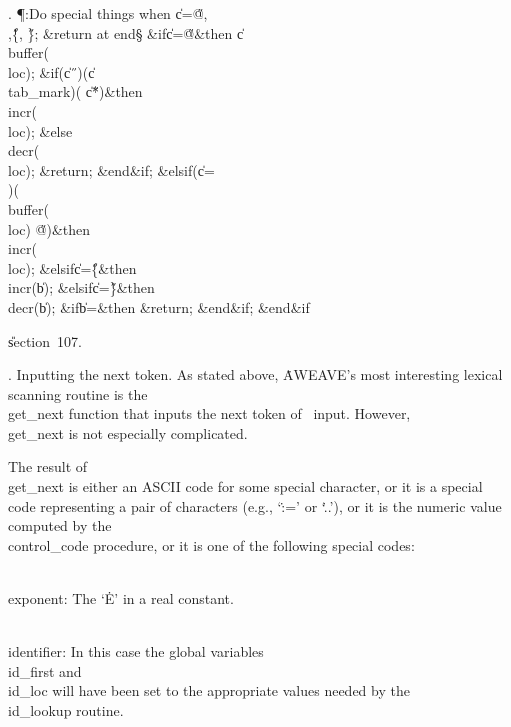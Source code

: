 . \P\?:Do special things when \|c\?=\?\H{@}\?,\?\H{\\}\?,\?\H{\{}\?,%
\?\H{\}}; \&{return} at end\X\S\?\6
\&{if}\1\1\8\|c\?=\?\H{@}\2\8\&{then}\6
\|c\?\K\?\\{buffer}\?\1(\?\\{loc}\?\2)\?;\6
\&{if}\1\1\?\8\1(\?\|c\?\I\?\H{\ }\?\2)\W\1(\?\|c\?\I\?\\{tab\_mark}\?\2)\W\1(%
\?\|c\?\I\?\H{*}\?\2)\?\2\8\&{then}\6
\\{incr}\?\1(\?\\{loc}\?\2)\?;\6
\4\&{else}\6
\\{decr}\?\1(\?\\{loc}\?\2)\?;\5
\?\&{return}\?;\2\6
\&{end}\8\2\&{if}\1;\6
\4\&{elsif}\1\?\8\1(\?\|c\?=\?\H{\\}\?\2)\W\1(\?\\{buffer}\?\1(\?\\{loc}\?\2)\I%
\?\H{@}\?\2)\?\2\8\&{then}\6
\\{incr}\?\1(\?\\{loc}\?\2)\?;\6
\4\&{elsif}\1\8\|c\?=\?\H{\{}\2\8\&{then}\6
\\{incr}\?\1(\?\|b\?\2)\?;\6
\4\&{elsif}\1\8\|c\?=\?\H{\}}\2\8\&{then}\6
\\{decr}\?\1(\?\|b\?\2)\?;\6
\&{if}\1\1\8\|b\?=\2\8\&{then}\6
\?\&{return}\?;\2\6
\&{end}\8\2\&{if}\1;\2\6
\&{end}\8\2\&{if}\1\par
\U section~107.\fi

.  Inputting the next token.
As stated above, \.{AWEAVE}'s most interesting lexical scanning routine is the
\\{get\_next} function that inputs the next token of \ADA\ input. However,
\\{get\_next} is not especially complicated.

The result of \\{get\_next} is either an ASCII code for some special character,
or it is a special code representing a pair of characters (e.g., `\.{:=}'
or `\.{..}'), or it is the numeric value computed by the \\{control\_code}
procedure, or it is one of the following special codes:

\yskip\hang \\{exponent}: The `\.E' in a real constant.

\yskip\hang \\{identifier}: In this case the global variables \\{id\_first}
and \\{id\_loc} will have been set to the appropriate values needed by the
\\{id\_lookup} routine.

